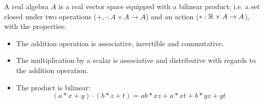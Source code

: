 \begin{definition}[Algebra]\label{d:algebra}
    A real algebra $A$ is a real vector space equipped with a bilinear product; i.e. a set closed under two operations ($+, \cdot: A\times A \to A$) and an action ($*: \mathbb{R} \times A \to A$), with the properties:

	\begin{itemize}
		\item The addition operation is associative, invertible and commutative.
		\item The multiplication by a scalar is associative and distributive with regards to the addition operation.
		\item The product is bilinear:
				\[(a*x + y)\cdot (b*z + t) = ab*xz + a*xt + b*yz + yt\]
	\end{itemize}


\end{definition}
